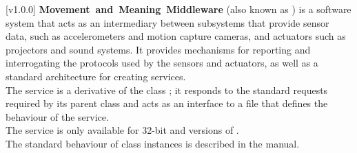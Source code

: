 [v1.0.0]
\textbf{Movement~and~Meaning~Middleware} (also known as \mplusm{}) is a software system
that acts as an intermediary between subsystems that provide sensor data, such as
accelerometers and motion capture cameras, and actuators such as projectors and sound
systems.
It provides mechanisms for reporting and interrogating the protocols used by the sensors
and actuators, as well as a standard architecture for creating services.\\

The \CLF{} service is a derivative of the \mplusm{} class ;
it responds to the standard requests required by its parent class and acts as an interface
to a \CL{} file that defines the behaviour of the service.\\

The \CLF{} service is only available for \win{} 32-bit and \osx{} versions of \mplusm.\\

The standard behaviour of  class instances is described in
the \emph{\MMM} manual.
\primaryEnd{}
